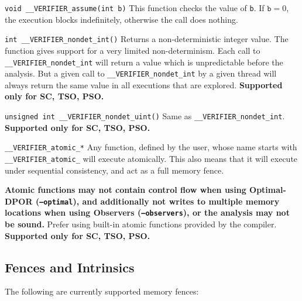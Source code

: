 \documentclass[a4paper]{article}
\newcommand{\limitsupport}[1]{\textbf{Supported only for #1.}}
\begin{document}
\begin{description}
\item{\texttt{void \_\_VERIFIER\_assume(int b)}}
%
  This function checks the value of \texttt{b}. If $\texttt{b} = 0$,
  the execution blocks indefinitely, otherwise the call does nothing.
\item{\texttt{int \_\_VERIFIER\_nondet\_int()}}
%
  Returns a non-deterministic integer value. The function gives
  support for a very limited non-determinism. Each call to
  \texttt{\_\_VERIFIER\_nondet\_int} will return a value which is
  unpredictable before the analysis. But a given call to
  \texttt{\_\_VERIFIER\_nondet\_int} by a given thread will always
  return the same value in all executions that are explored.
%
  \limitsupport{SC, TSO, PSO}
\item{\texttt{unsigned int \_\_VERIFIER\_nondet\_uint()}}
%
  Same as \texttt{\_\_VERIFIER\_nondet\_int}.
%
  \limitsupport{SC, TSO, PSO}
\item{\texttt{\_\_VERIFIER\_atomic\_*}}
%
  Any function, defined by the user, whose name starts with
  \texttt{\_\_VERIFIER\_atomic\_} will execute atomically. This also
  means that it will execute under sequential consistency, and act as
  a full memory fence.

  \textbf{Atomic functions may not contain control flow when using
    Optimal-DPOR (\texttt{--optimal}), and additionally not writes to
    multiple memory locations when using Observers
    (\texttt{--observers}), or the analysis may not be sound.} %
  Prefer using built-in atomic functions provided by the compiler.
%
  \limitsupport{SC, TSO, PSO}
\end{description}

\subsection{Fences and Intrinsics}

The following are currently supported memory fences:
\end{document}
